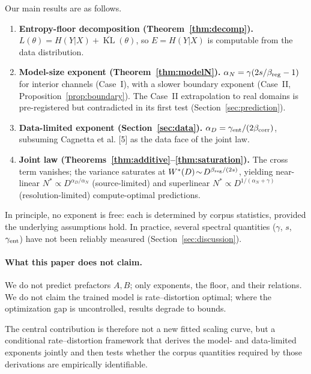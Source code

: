 \documentclass[entropy,article,submit,moreauthors,pdftex]{Definitions/mdpi}
\newcommand{\KL}{\operatorname{KL}}
\begin{document}
Our main results are as follows.
\begin{enumerate}[label=\textbf{(\arabic*)}]
\item \textbf{Entropy-floor decomposition (Theorem~\ref{thm:decomp}).}
  $L(\theta) = H(Y|X) + \overline{\KL}(\theta)$,
  so $E=H(Y|X)$ is computable from the data distribution.

\item \textbf{Model-size exponent (Theorem~\ref{thm:modelN}).}
  $\alpha_N = \gamma(2s/\beta_{\rm reg}-1)$ for interior channels (Case~I),
  with a slower boundary exponent (Case~II, Proposition~\ref{prop:boundary}).
  The Case~II extrapolation to real domains is pre-registered but contradicted
  in its first test (Section~\ref{sec:prediction}).

\item \textbf{Data-limited exponent (Section~\ref{sec:data}).}
  $\alpha_D = \gamma_{\rm ent}/(2\beta_{\rm corr})$, subsuming
  Cagnetta et al. [5] as the data face of the joint law.

\item \textbf{Joint law (Theorems~\ref{thm:additive}--\ref{thm:saturation}).}
  The cross term vanishes; the variance saturates at
  $W^*(D)\!\sim\!D^{\beta_{\rm reg}/(2s)}$, yielding near-linear
  $N^*\!\propto\!D^{\alpha_D/\alpha_N}$ (source-limited) and superlinear
  $N^*\!\propto\!D^{1/(\alpha_N+\gamma)}$ (resolution-limited)
  compute-optimal predictions.
\end{enumerate}

In principle, no exponent is free: each is determined by corpus statistics, provided the underlying assumptions hold. In
practice, several spectral quantities ($\gamma$, $s$, $\gamma_{\rm ent}$) have
not been reliably measured (Section~\ref{sec:discussion}).

\paragraph{What this paper does not claim.}
We do not predict prefactors $A,B$; only exponents, the floor, and their
relations.  We do not claim the trained model is rate--distortion optimal; where
the optimization gap is uncontrolled, results degrade to bounds.

The central contribution is therefore not a new fitted scaling curve, but a
conditional rate--distortion framework that derives the model- and data-limited
exponents jointly and then tests whether the corpus quantities required by those
derivations are empirically identifiable.
\end{document}
